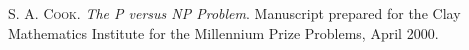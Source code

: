 \begin{thebibliography}{}
    \textsc{S. A. Cook}.
    \emph{The P versus NP Problem}.
    Manuscript prepared for the Clay Mathematics Institute for the Millennium Prize Problems, April 2000.
\end{thebibliography}